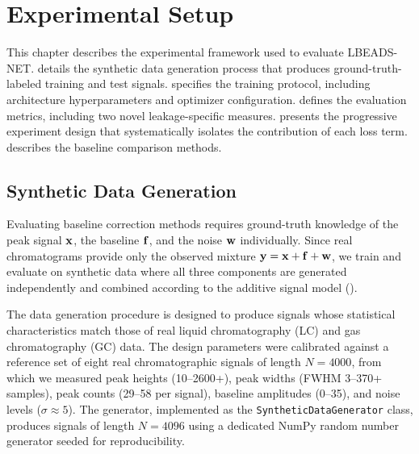 \chapter{Experimental Setup}
\label{chap:experiments}

This chapter describes the experimental framework used to evaluate LBEADS-NET.  details the synthetic data generation process that produces ground-truth-labeled training and test signals.  specifies the training protocol, including architecture hyperparameters and optimizer configuration.  defines the evaluation metrics, including two novel leakage-specific measures.  presents the progressive experiment design that systematically isolates the contribution of each loss term.  describes the baseline comparison methods.


\section{Synthetic Data Generation}
\label{sec:exp_data}

Evaluating baseline correction methods requires ground-truth knowledge of the peak signal $\mathbf{x}$, the baseline $\mathbf{f}$, and the noise $\mathbf{w}$ individually. Since real chromatograms provide only the observed mixture $\mathbf{y} = \mathbf{x} + \mathbf{f} + \mathbf{w}$, we train and evaluate on synthetic data where all three components are generated independently and combined according to the additive signal model ().

The data generation procedure is designed to produce signals whose statistical characteristics match those of real liquid chromatography (LC) and gas chromatography (GC) data. The design parameters were calibrated against a reference set of eight real chromatographic signals of length $N = 4000$, from which we measured peak heights (10--2600+), peak widths (FWHM 3--370+ samples), peak counts (29--58 per signal), baseline amplitudes (0--35), and noise levels ($\sigma \approx 5$). The generator, implemented as the \texttt{SyntheticDataGenerator} class, produces signals of length $N = 4096$ using a dedicated NumPy random number generator seeded for reproducibility.


